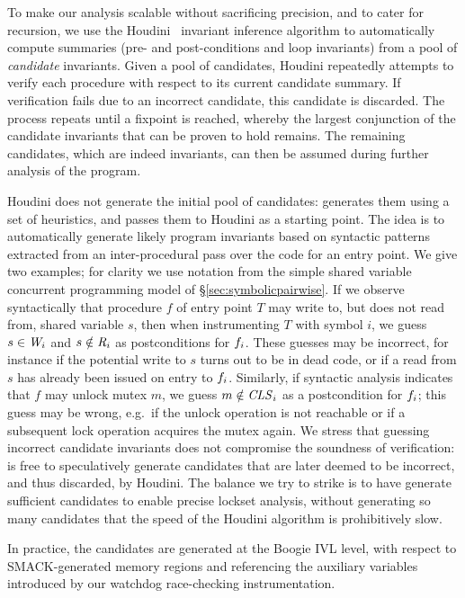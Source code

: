 To make our analysis scalable without sacrificing precision, and to cater for recursion, we use the Houdini~\cite{flanagan2001houdini} invariant inference algorithm to automatically compute summaries (pre- and post-conditions and loop invariants) from a pool of \emph{candidate} invariants.  Given a pool of candidates, Houdini repeatedly attempts to verify each procedure with respect to its current candidate summary.  If verification fails due to an incorrect candidate, this candidate is discarded.  The process repeats until a fixpoint is reached, whereby the largest conjunction of the candidate invariants that can be proven to hold remains.  The remaining candidates, which are indeed invariants, can then be assumed during further analysis of the program.

Houdini does not generate the initial pool of candidates: \whoop generates them using a set of heuristics, and passes them to Houdini as a starting point.  The idea is to automatically generate likely program invariants based on syntactic patterns extracted from an inter-procedural pass over the code for an entry point.  We give two examples; for clarity we use notation from the simple shared variable concurrent programming model of \S\ref{sec:symbolicpairwise}.  If we observe syntactically that procedure $f$ of entry point $T$ may write to, but does not read from, shared variable $s$, then when instrumenting $T$ with symbol $i$, we guess $s \in \mathit{W}_{i}$ and $s \notin\mathit{R}_{i}$ as postconditions for $f_{i}$.  These guesses may be incorrect, for instance if the potential write to $s$ turns out to be in dead code, or if a read from $s$ has already been issued on entry to $f_{i}$.  Similarly, if syntactic analysis indicates that $f$ may unlock mutex $m$, we guess $m \notin \mathit{CLS}_{i}$ as a postcondition for $f_{i}$; this guess may be wrong, e.g.\ if the unlock operation is not reachable or if a subsequent lock operation acquires the mutex again.  We stress that guessing incorrect candidate invariants does not compromise the soundness of verification: \whoop is free to speculatively generate candidates that are later deemed to be incorrect, and thus discarded, by Houdini.  The balance we try to strike is to have \whoop generate sufficient candidates to enable precise lockset analysis, without generating so many candidates that the speed of the Houdini algorithm is prohibitively slow.

In practice, the candidates are generated at the Boogie IVL level, with respect to SMACK-generated memory regions and referencing the auxiliary variables introduced by our watchdog race-checking instrumentation.

